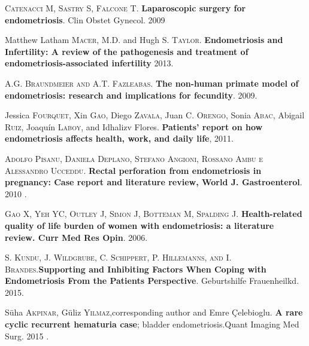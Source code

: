 \documentclass[12pt]{article} %
\begin{document}
\textsc{Catenacci M, Sastry S, Falcone T}.\textbf{ Laparoscopic surgery for endometriosis}. Clin Obstet Gynecol. 2009

\vspace{0,5cm}

Matthew Latham\textsc{ Macer}, M.D. and Hugh S.\textsc{ Taylor}. \textbf{Endometriosis and Infertility: A review of the pathogenesis and treatment of endometriosis-associated infertility} 2013.

\vspace{0,5cm}

\textsc{A.G. Braundmeier and A.T. Fazleabas}. \textbf{The non-human primate model of endometriosis: research and implications for fecundity}. 2009.

\vspace{0,5cm}

Jessica\textsc{ Fourquet}, Xin\textsc{ Gao}, Diego\textsc{ Zavala}, Juan C. \textsc{Orengo}, Sonia\textsc{ Abac}, Abigail\textsc{ Ruiz}, Joaquín\textsc{ Laboy}, and Idhalizv{ Flores}.\textbf{ Patients’ report on how endometriosis affects health, work, and daily life}, 2011.

\vspace{0,5cm}

\textsc{Adolfo Pisanu, Daniela Deplano, Stefano Angioni, Rossano Ambu e Alessandro Ucceddu}. \textbf{Rectal perforation from endometriosis in pregnancy: Case report and literature review, World J. Gastroenterol}. 2010 .

\vspace{0,5cm}

\textsc{Gao X, Yeh YC, Outley J, Simon J, Botteman M, Spalding J}. \textbf{Health-related quality of life burden of women with endometriosis: a literature review. Curr Med Res Opin}. 2006.

\vspace{0,5cm}

\textsc{S. Kundu, J. Wildgrube, C. Schippert, P. Hillemanns, and I. Brandes}.\textbf{Supporting and Inhibiting Factors When Coping with Endometriosis From the Patients Perspective}. Geburtshilfe Frauenheilkd. 2015.

\vspace{0,5cm}

Süha\textsc{ Akpınar}, Güliz \textsc{Yılmaz},corresponding author and Emre Çelebioglu.\textbf{ A rare cyclic recurrent hematuria case}; bladder endometriosis.Quant Imaging Med Surg. 2015 .

\vspace{0,5cm}
\end{document}
